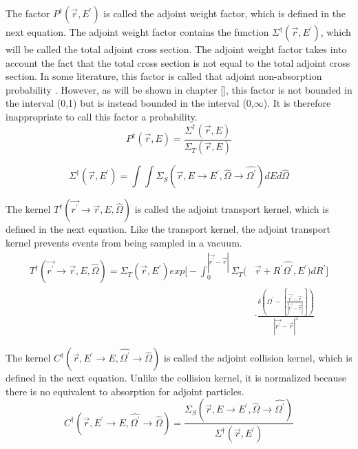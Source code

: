The factor $P^{\dagger}(\vec{r},E^{'})$ is called the adjoint weight factor, which
is defined in the next equation. The adjoint weight factor contains the 
function $\Sigma^{\dagger}(\vec{r},E^{'})$, which will be called the total
adjoint cross section. The adjoint weight factor takes into account the fact
that the total cross section is not equal to the total adjoint cross section.
In some literature, this factor is called that adjoint non-absorption 
probability \citep{amos}. However, as will be shown in chapter \ref{}, this
factor is not bounded in the interval (0,1) but is instead bounded in the 
interval (0,$\infty$). It is therefore inappropriate to call this factor
a probability.
\begin{equation}
  P^{\dagger}(\vec{r},E) = \frac{\Sigma^{\dagger}(\vec{r},E)}
  {\Sigma_T(\vec{r},E)}
\end{equation}

\begin{equation}
  \Sigma^{\dagger}(\vec{r},E^{'}) = \int\int 
  \Sigma_S(\vec{r},E \to E^{'},\hat{\Omega} \to \hat{\Omega^{'}}) dEd\hat{\Omega}
\end{equation}

The kernel $T^{\dagger}(\vec{r^{'}} \to \vec{r},E,\hat{\Omega})$ is called
the adjoint transport kernel, which is defined in the next equation. Like the
transport kernel, the adjoint transport kernel prevents events from being
sampled in a vacuum.
\begin{equation}
  \begin{split}
  T^{\dagger}(\vec{r^{'}} \to \vec{r},E,\hat{\Omega}) = 
  \Sigma_T(\vec{r},E^{'}) exp\Big[-\int_0^{|\vec{r^{'}} - \vec{r}|} 
      \Sigma_T(&\vec{r}+R^{'}\hat{\Omega^{'}},E^{'})dR^{'} \Big] \\
    & \cdot \frac{\delta \left(\Omega^{'} - \left[\frac{\vec{r^{'}} - \vec{r}}
        {|\vec{r^{'}} - \vec{r}|}\right]\right)}
    {|\vec{r^{'}} - \vec{r}|^2}
  \end{split}
\end{equation}

The kernel $C^{\dagger}(\vec{r},E^{'} \to E,\hat{\Omega^{'}} \to \hat{\Omega})$ is
called the adjoint collision kernel, which is defined in the next equation.
Unlike the collision kernel, it is normalized because there is no equivalent
to absorption for adjoint particles.  
\begin{equation}
  C^{\dagger}(\vec{r},E^{'} \to E,\hat{\Omega^{'}} \to \hat{\Omega}) = 
  \frac{\Sigma_S(\vec{r},E \to E^{'},\hat{\Omega} \to \hat{\Omega^{'}})}
       {\Sigma^{\dagger}(\vec{r},E^{'})}
\end{equation}

